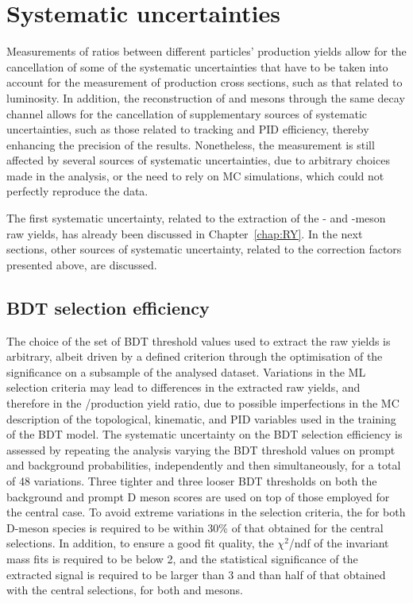\section{Systematic uncertainties}
Measurements of ratios between different particles' production yields allow for the cancellation of some of the systematic uncertainties that have to be taken into account for the measurement of production cross sections, such as that related to luminosity. In addition, the reconstruction of \ds and \dpl mesons through the same decay channel allows for the cancellation of supplementary sources of systematic uncertainties, such as those related to tracking and PID efficiency, thereby enhancing the precision of the results. Nonetheless, the measurement is still affected by several sources of systematic uncertainties, due to arbitrary choices made in the analysis, or the need to rely on MC simulations, which could not perfectly reproduce the data. 

The first systematic uncertainty, related to the extraction of the \ds- and \dpl-meson raw yields, has already been discussed in Chapter~\ref{chap:RY}. In the next sections, other sources of systematic uncertainty, related to the correction factors presented above, are discussed.

\subsection{BDT selection efficiency}\label{sec:BDT_syst}
The choice of the set of BDT threshold values used to extract the raw yields is arbitrary, albeit driven by a defined criterion through the optimisation of the significance on a subsample of the analysed dataset. Variations in the ML selection criteria may lead to differences in the extracted raw yields, and therefore in the \ds/\dpl production yield ratio, due to possible imperfections in the MC description of the topological, kinematic, and PID variables used in the training of the BDT model. The systematic uncertainty on the BDT selection efficiency is assessed by repeating the analysis varying the BDT threshold values on prompt and background probabilities, independently and then simultaneously, for a total of 48 variations. Three tighter and three looser BDT thresholds on both the background and prompt D meson scores are used on top of those employed for the central case. To avoid extreme variations in the selection criteria, the \aeffp for both D-meson species is required to be within 30\% of that obtained for the central selections. In addition, to ensure a good fit quality, the $\chi^2$/ndf of the invariant mass fits is required to be below 2, and the statistical significance of the extracted signal is required to be larger than 3 and than half of that obtained with the central selections, for both \ds and \dpl mesons. 

